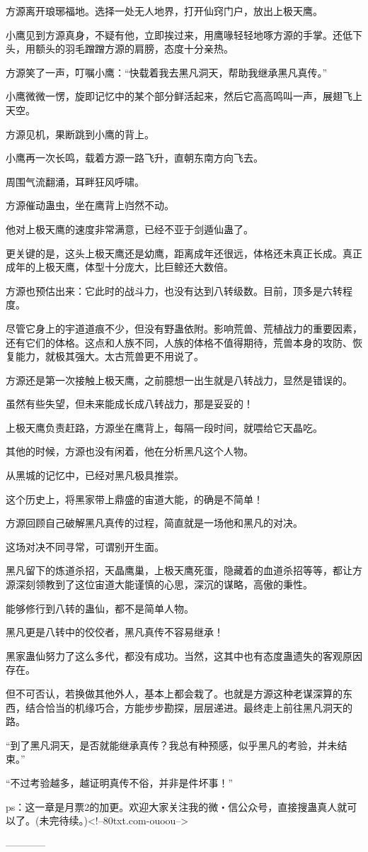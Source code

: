 \begin{this_body}
方源离开琅琊福地。选择一处无人地界，打开仙窍门户，放出上极天鹰。

小鹰见到方源真身，不疑有他，立即挨过来，用鹰喙轻轻地啄方源的手掌。还低下头，用额头的羽毛蹭蹭方源的肩膀，态度十分亲热。

方源笑了一声，叮嘱小鹰：“快载着我去黑凡洞天，帮助我继承黑凡真传。”

小鹰微微一愣，旋即记忆中的某个部分鲜活起来，然后它高高鸣叫一声，展翅飞上天空。

方源见机，果断跳到小鹰的背上。

小鹰再一次长鸣，载着方源一路飞升，直朝东南方向飞去。

周围气流翻涌，耳畔狂风呼啸。

方源催动蛊虫，坐在鹰背上岿然不动。

他对上极天鹰的速度非常满意，已经不亚于剑遁仙蛊了。

更关键的是，这头上极天鹰还是幼鹰，距离成年还很远，体格还未真正长成。真正成年的上极天鹰，体型十分庞大，比巨鲸还大数倍。

方源也预估出来：它此时的战斗力，也没有达到八转级数。目前，顶多是六转程度。

尽管它身上的宇道道痕不少，但没有野蛊依附。影响荒兽、荒植战力的重要因素，还有它们的体格。这点和人族不同，人族的体格不值得期待，荒兽本身的攻防、恢复能力，就极其强大。太古荒兽更不用说了。

方源还是第一次接触上极天鹰，之前臆想一出生就是八转战力，显然是错误的。

虽然有些失望，但未来能成长成八转战力，那是妥妥的！

上极天鹰负责赶路，方源坐在鹰背上，每隔一段时间，就喂给它天晶吃。

其他的时候，方源也没有闲着，他在分析黑凡这个人物。

从黑城的记忆中，已经对黑凡极具推崇。

这个历史上，将黑家带上鼎盛的宙道大能，的确是不简单！

方源回顾自己破解黑凡真传的过程，简直就是一场他和黑凡的对决。

这场对决不同寻常，可谓别开生面。

黑凡留下的炼道杀招，天晶鹰巢，上极天鹰死蛋，隐藏着的血道杀招等等，都让方源深刻领教到了这位宙道大能谨慎的心思，深沉的谋略，高傲的秉性。

能够修行到八转的蛊仙，都不是简单人物。

黑凡更是八转中的佼佼者，黑凡真传不容易继承！

黑家蛊仙努力了这么多代，都没有成功。当然，这其中也有态度蛊遗失的客观原因存在。

但不可否认，若换做其他外人，基本上都会栽了。也就是方源这种老谋深算的东西，结合恰当的机缘巧合，方能步步勘探，层层递进。最终走上前往黑凡洞天的路。

“到了黑凡洞天，是否就能继承真传？我总有种预感，似乎黑凡的考验，并未结束。”

“不过考验越多，越证明真传不俗，并非是件坏事！”

ps：这一章是月票2的加更。欢迎大家关注我的微・信公众号，直接搜蛊真人就可以了。(未完待续。)<!--80txt.com-ouoou-->

------------

\end{this_body}

